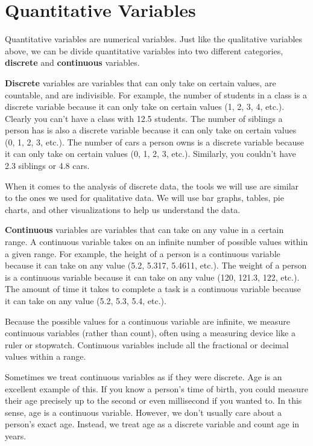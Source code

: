 \documentclass[
  letterpaper,
  DIV=11,
  numbers=noendperiod]{scrreprt}
\begin{document}
\section*{Quantitative Variables}\label{quantitative-variables}


Quantitative variables are numerical variables. Just like the
qualitative variables above, we can be divide quantitative variables
into two different categories, \textbf{discrete} and \textbf{continuous}
variables.

\textbf{Discrete} variables are variables that can only take on certain
values, are countable, and are indivisible. For example, the number of
students in a class is a discrete variable because it can only take on
certain values (1, 2, 3, 4, etc.). Clearly you can't have a class with
12.5 students. The number of siblings a person has is also a discrete
variable because it can only take on certain values (0, 1, 2, 3, etc.).
The number of cars a person owns is a discrete variable because it can
only take on certain values (0, 1, 2, 3, etc.). Similarly, you couldn't
have 2.3 siblings or 4.8 cars.

When it comes to the analysis of discrete data, the tools we will use
are similar to the ones we used for qualitative data. We will use bar
graphs, tables, pie charts, and other visualizations to help us
understand the data.

\textbf{Continuous} variables are variables that can take on any value
in a certain range. A continuous variable takes on an infinite number of
possible values within a given range. For example, the height of a
person is a continuous variable because it can take on any value (5.2,
5.317, 5.4611, etc.). The weight of a person is a continuous variable
because it can take on any value (120, 121.3, 122, etc.). The amount of
time it takes to complete a task is a continuous variable because it can
take on any value (5.2, 5.3, 5.4, etc.).

Because the possible values for a continuous variable are infinite, we
measure continuous variables (rather than count), often using a
measuring device like a ruler or stopwatch. Continuous variables include
all the fractional or decimal values within a range.

Sometimes we treat continuous variables as if they were discrete. Age is
an excellent example of this. If you know a person's time of birth, you
could measure their age precisely up to the second or even millisecond
if you wanted to. In this sense, age is a continuous variable. However,
we don't usually care about a person's exact age. Instead, we treat age
as a discrete variable and count age in years.
\end{document}
